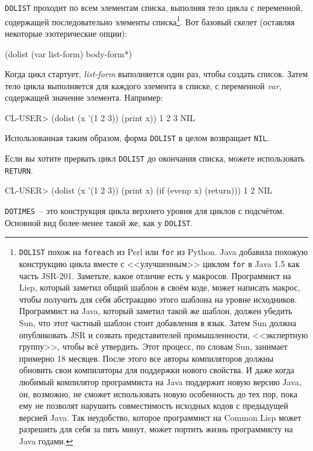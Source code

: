 \lstinline{DOLIST} проходит по всем элементам списка, выполняя тело цикла с переменной,
содержащей последовательно элементы списка\footnote{\lstinline{DOLIST} похож на
  \lstinline{foreach} из Perl или \lstinline{for} из Python. Java добавила похожую
  конструкцию цикла вместе с <<улучшенным>> циклом \lstinline{for} в Java 1.5 как часть
  JSR-201. Заметьте, какое отличие есть у макросов. Программист на Lisp, который заметил
  общий шаблон в своём коде, может написать макрос, чтобы получить для себя абстракцию
  этого шаблона на уровне исходников. Программист на Java, который заметил такой же
  шаблон, должен убедить Sun, что этот частный шаблон стоит добавления в язык. Затем Sun
  должна опубликовать JSR и созвать представителей промышленности, <<экспертную группу>>,
  чтобы всё утвердить. Этот процесс, по словам Sun, занимает примерно 18 месяцев. После
  этого все авторы компиляторов должны обновить свои компиляторы для поддержки нового
  свойства. И даже когда любимый компилятор программиста на Java поддержит новую версию
  Java, он, возможно, не сможет использовать новую особенность до тех пор, пока ему не
  позволят нарушить совместимость исходных кодов с предыдущей версией Java. Так
  неудобство, которое программист на Common Lisp может разрешить для себя за пять минут,
  может портить жизнь программисту на Java годами.}. Вот базовый скелет (оставляя
некоторые эзотерические опции):

\begin{myverb}
(dolist (var list-form)
  body-form*)
\end{myverb}

Когда цикл стартует, \textit{list-form} выполняется один раз, чтобы создать список. Затем
тело цикла выполняется для каждого элемента в списке, с переменной \textit{var},
содержащей значение элемента. Например:

\begin{myverb}
CL-USER> (dolist (x '(1 2 3)) (print x))
1
2
3
NIL
\end{myverb}

Использованная таким образом, форма \lstinline{DOLIST} в целом возвращает \lstinline{NIL}.

Если вы хотите прервать цикл \lstinline{DOLIST} до окончания списка, можете использовать
\lstinline{RETURN}.

\begin{myverb}
CL-USER> (dolist (x '(1 2 3)) (print x) (if (evenp x) (return)))
1
2
NIL
\end{myverb}

\lstinline{DOTIMES}~-- это конструкция цикла верхнего уровня для циклов с подсчётом. Основной
вид более-менее такой же, как у \lstinline{DOLIST}.

